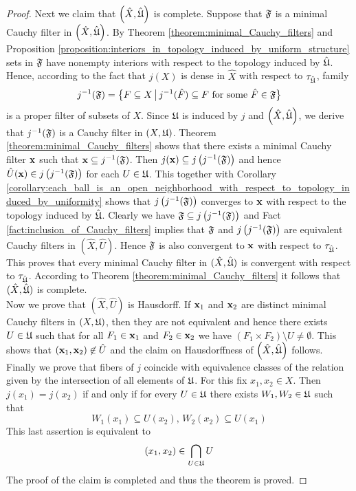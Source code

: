 \begin{proof}
Next we claim that $\left(\hat{X},\hat{{\mathfrak U}}\right)$ is complete. Suppose that ${\mathfrak F}$ is a minimal Cauchy filter in $\left(\hat{X},\hat{{\mathfrak U}}\right)$. By Theorem \ref{theorem:minimal_Cauchy_filters} and Proposition \ref{proposition:interiors_in_topology_induced_by_uniform_structure} sets in ${\mathfrak F}$ have nonempty interiors with respect to the topology induced by $\hat{{\mathfrak U}}$. Hence, according to the fact that $j(X)$ is dense in $\hat{X}$ with respect to $\tau_{\hat{{\mathfrak U}}}$, family
$$j^{-1}({\mathfrak F}) = \big\{F \subseteq X\,\big|\,j^{-1}(\hat{F})\subseteq F\mbox{ for some }\hat{F} \in {\mathfrak F}\big\}$$
is a proper filter of subsets of $X$. Since ${\mathfrak U}$ is induced by $j$ and $\left(\hat{X},\hat{{\mathfrak U}}\right)$, we derive that $j^{-1}({\mathfrak F})$ is a Cauchy filter in $\left(X,{\mathfrak U}\right)$. Theorem \ref{theorem:minimal_Cauchy_filters} shows that there exists a minimal Cauchy filter $\mathbf{x}$ such that $\mathbf{x} \subseteq j^{-1}({\mathfrak F})$. Then $j(\mathbf{x})\subseteq j\left(j^{-1}({\mathfrak F})\right)$ and hence $\hat{U}(\mathbf{x}) \in j\left(j^{-1}({\mathfrak F})\right)$ for each $U \in {\mathfrak U}$. This together with Corollary \ref{corollary:each_ball_is_an_open_neighborhood_with_respect_to_topology_induced_by_uniformity} shows that $j\left(j^{-1}({\mathfrak F})\right)$ converges to $\mathbf{x}$ with respect to the topology induced by $\hat{{\mathfrak U}}$. Clearly we have ${\mathfrak F} \subseteq j\left(j^{-1}({\mathfrak F})\right)$ and Fact \ref{fact:inclusion_of_Cauchy_filters} implies that ${\mathfrak F}$ and $j\left(j^{-1}({\mathfrak F})\right)$ are equivalent Cauchy filters in $\left(\hat{X},\hat{U}\right)$. Hence ${\mathfrak F}$ is also convergent to $\mathbf{x}$ with respect to $\tau_{\hat{{\mathfrak U}}}$. This proves that every minimal Cauchy filter in $(\hat{X},\hat{{\mathfrak U}})$ is convergent with respect to $\tau_{\hat{{\mathfrak U}}}$. According to Theorem \ref{theorem:minimal_Cauchy_filters} it follows that $(\hat{X},\hat{{\mathfrak U}})$ is complete.\\
Now we prove that $\left(\hat{X},\hat{U}\right)$ is Hausdorff. If $\mathbf{x}_1$ and $\mathbf{x}_2$ are distinct minimal Cauchy filters in $\left(X,{\mathfrak U}\right)$, then they are not equivalent and hence there exists $U \in {\mathfrak U}$ such that for all $F_1 \in \mathbf{x}_1$ and $F_2 \in \mathbf{x}_2$ we have $\left(F_1\times F_2\right)\setminus U \neq \emptyset$. This shows that $(\mathbf{x}_1,\mathbf{x}_2) \not \in \hat{U}$ and the claim on Hausdorffness of $\left(\hat{X},\hat{{\mathfrak U}}\right)$ follows.\\
Finally we prove that fibers of $j$ coincide with equivalence classes of the relation given by the intersection of all elements of ${\mathfrak U}$. For this fix $x_1,x_2\in X$. Then $j(x_1) = j(x_2)$ if and only if for every $U\in {\mathfrak U}$ there exists $W_1,W_2\in {\mathfrak U}$ such that 
$$W_1(x_1)\subseteq U(x_2),\,W_2(x_2)\subseteq U(x_1)$$
This last assertion is equivalent to
$$(x_1,x_2) \in \bigcap_{U\in {\mathfrak U}}U$$
The proof of the claim is completed and thus the theorem is proved.
\end{proof}


